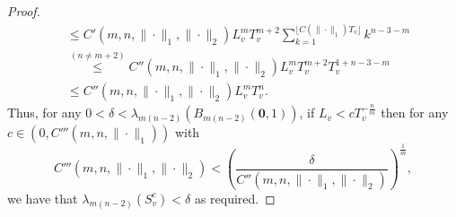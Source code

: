 \documentclass[10pt]{amsart}
\theoremstyle{definition}
\begin{document}
\begin{proof}
\begin{align*}
     & \leq C'(m,n,\|\cdot\|_{1},\|\cdot\|_{2})L_{v}^{m}T_{v}^{m+2}\sum_{k=1}^{ \lfloor C(\|\cdot\|_{1})T_{v}\rfloor}k^{n-3-m}\\
     &\overset{(n\ne m+2)}{\leq} C''(m,n,\|\cdot\|_{1},\|\cdot\|_{2})L_{v}^{m}T_{v}^{m+2}T_{v}^{1+n-3-m}\\
     &\leq C''(m,n,\|\cdot\|_{1},\|\cdot\|_{2})L_{v}^{m}T_{v}^{n}.
 \end{align*}
 Thus, for any $0<\delta<\lambda_{m(n-2)}\left(B_{m(n-2)}(\boldsymbol{0},1)\right)$, if $L_{v}<cT_{v}^{-\frac{n}{m}}$ then for any  $c\in(0,C'''(m,n,\|\cdot\|_{1}))$ with
 \begin{equation*}
     C'''(m,n,\|\cdot\|_{1},\|\cdot\|_{2}) < \left(\frac{\delta}{C''(m,n,\|\cdot\|_{1},\|\cdot\|_{2})}\right)^{\frac{1}{m}},
 \end{equation*}
 we have that $\lambda_{m(n-2)}\left(S_{v}^{c}\right)<\delta$ as required.


\end{proof}
\end{document}
